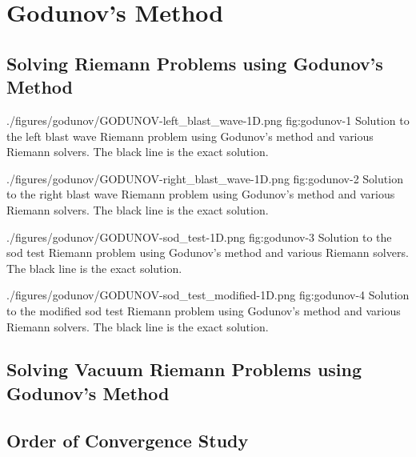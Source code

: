 \section{Godunov's Method}




\subsection{Solving Riemann Problems using Godunov's Method}


\quickfigcap
	{./figures/godunov/GODUNOV-left_blast_wave-1D.png}
	{fig:godunov-1}
	{
		Solution to the left blast wave 
		Riemann problem using Godunov's method and various Riemann solvers.
		The black line is the exact solution.
	}

\quickfigcap
	{./figures/godunov/GODUNOV-right_blast_wave-1D.png}
	{fig:godunov-2}
	{
		Solution to the right blast wave 
		Riemann problem using Godunov's method and various Riemann solvers.
		The black line is the exact solution.
	}

\quickfigcap
	{./figures/godunov/GODUNOV-sod_test-1D.png}
	{fig:godunov-3}
	{
		Solution to the sod test
		Riemann problem using Godunov's method and various Riemann solvers.
		The black line is the exact solution.
	}

\quickfigcap
	{./figures/godunov/GODUNOV-sod_test_modified-1D.png}
	{fig:godunov-4}
	{
		Solution to the modified sod test
		Riemann problem using Godunov's method and various Riemann solvers.
		The black line is the exact solution.
	}

	




\subsection{Solving Vacuum Riemann Problems using Godunov's Method}









\subsection{Order of Convergence Study}




